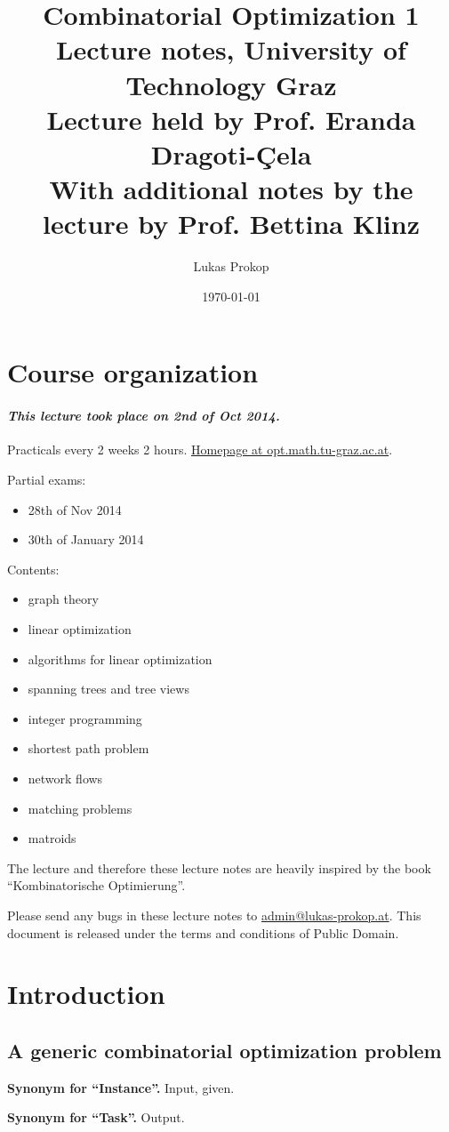 \documentclass{article}
\title{
  Combinatorial Optimization 1 \\
  \large{Lecture notes, University of Technology Graz} \\
  \small{Lecture held by Prof. Eranda Dragoti-Çela} \\
  \small{With additional notes by the lecture by Prof. Bettina Klinz}
}
\date{\today}
\author{Lukas Prokop}
\newcommand{\dateref}[1]{\paragraph{\textit{This lecture took place on #1.}}}
\newcommand{\synonym}[2]{\textbf{Synonym for ``#1''.} #2.\par}
\begin{document}
\maketitle
\tableofcontents

\section{Course organization}
%
\dateref{2nd of Oct 2014}

Practicals every 2 weeks 2 hours.
\href{http://opt.math.tu-graz.ac.at/~cela/Vorlesungen/KombOpt1/main.htm}{Homepage at opt.math.tu-graz.ac.at}.

Partial exams:
\begin{itemize}
  \item 28th of Nov 2014
  \item 30th of January 2014
\end{itemize}

Contents:
\begin{itemize}
  \item graph theory
  \item linear optimization
  \item algorithms for linear optimization
  \item spanning trees and tree views
  \item integer programming
  \item shortest path problem
  \item network flows
  \item matching problems
  \item matroids
\end{itemize}

The lecture and therefore these lecture notes are heavily inspired by the book ``Kombinatorische Optimierung''.

Please send any bugs in these lecture notes to \href{mailto:admin@lukas-prokop.at}{admin@lukas-prokop.at}.
This document is released under the terms and conditions of Public Domain.

\newpage
\section{Introduction}

\subsection{A generic combinatorial optimization problem}
%
\synonym{Instance}{Input, given}
\synonym{Task}{Output}
\end{document}

